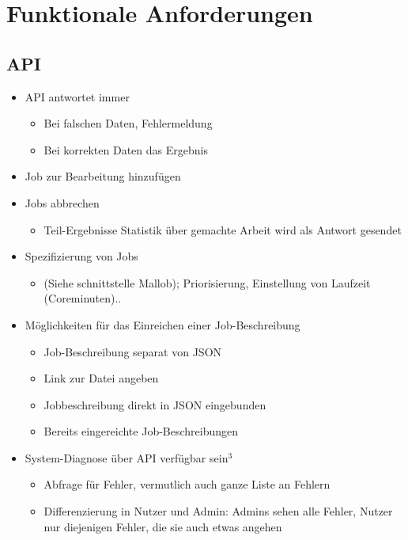\section{Funktionale Anforderungen}


\subsection{API}
\begin{itemize}

        
    \item API antwortet immer
    \begin{itemize}
        \item Bei falschen Daten, Fehlermeldung
        \item Bei korrekten Daten das Ergebnis
    \end{itemize}

    \item Job zur Bearbeitung hinzufügen
    
    
    \item Jobs abbrechen
    \begin{itemize}
        \item Teil-Ergebnisse Statistik über gemachte Arbeit wird als Antwort gesendet
    \end{itemize}
    
    
    \item Spezifizierung von Jobs 
    \begin{itemize}
        \item (Siehe schnittstelle Mallob); Priorisierung, Einstellung von Laufzeit (Coreminuten)..
    \end{itemize}
    
    
    \item Möglichkeiten für das Einreichen einer Job-Beschreibung
    \begin{itemize}
        \item Job-Beschreibung separat von JSON
        \item Link zur Datei angeben
        \item Jobbeschreibung direkt in JSON eingebunden
        \item Bereits eingereichte Job-Beschreibungen
    \end{itemize}
    
    \item System-Diagnose über API verfügbar sein$^3$
        \begin{itemize}
            \item Abfrage für Fehler, vermutlich auch ganze Liste an Fehlern
            \item Differenzierung in Nutzer und Admin: Admins sehen alle Fehler, Nutzer nur diejenigen Fehler, die sie auch etwas angehen
        \end{itemize}
    

\end{itemize}
